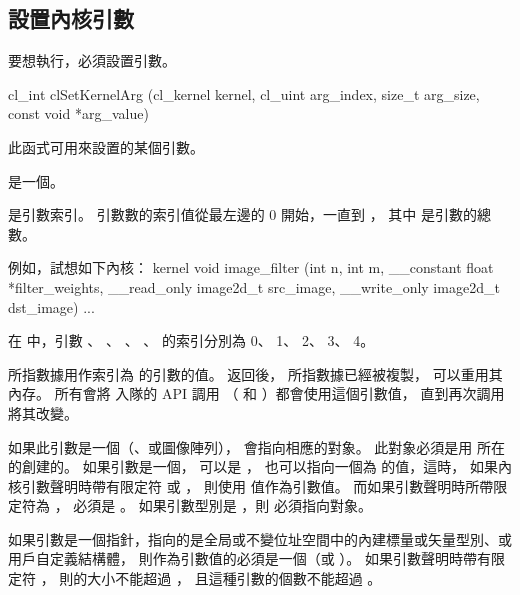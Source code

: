 \subsection{設置內核引數}

要想執行，必須設置引數。


\startCLFUNC
cl_int clSetKernelArg (cl_kernel kernel,
			cl_uint arg_index,
			size_t arg_size,
			const void *arg_value)
\stopCLFUNC

此函式可用來設置的某個引數。

 是一個。

 是引數索引。
引數數的索引值從最左邊的 0 開始，一直到 ，
其中  是引數的總數。

例如，試想如下內核：
\startclc
kernel void
image_filter (int n, int m,
		__constant float *filter_weights,
		__read_only image2d_t src_image,
		__write_only image2d_t dst_image)
{
	...
}
\stopclc

在  中，引數 、 、 、
、  的索引分別為 0、 1、 2、 3、 4。

 所指數據用作索引為  的引數的值。
 返回後，  所指數據已經被複製，
可以重用其內存。
所有會將  入隊的 API 調用
（  和 ）都會使用這個引數值，
直到再次調用  將其改變。

如果此引數是一個（、或圖像陣列），
 會指向相應的對象。
此對象必須是用  所在的創建的。
如果引數是一個，  可以是 ，
也可以指向一個為  的值，這時，
如果內核引數聲明時帶有限定符  或 ，
則使用  值作為引數值。
而如果引數聲明時所帶限定符為 ，  必須是 。
如果引數型別是 ，則  必須指向對象。

如果引數是一個指針，指向的是全局或不變位址空間中的內建標量或矢量型別、或用戶自定義結構體，
則作為引數值的必須是一個（或 ）。
如果引數聲明時帶有限定符 ，
則的大小不能超過 ，
且這種引數的個數不能超過 。

